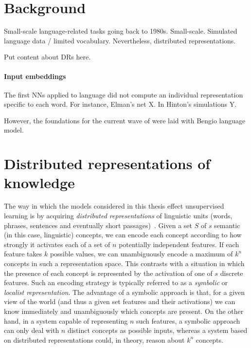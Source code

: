 \documentclass[11pt,letterpaper]{article}
\begin{document}
\section{Background}

Small-scale language-related tasks going back to 1980s. Small-scale. Simulated language data / limited vocabulary. Nevertheless, distributed representations. 

Put content about DRs here. 

\paragraph{Input embeddings}
The first NNs applied to language did not compute an individual representation specific to each word. For instance, Elman's net X. In Hinton's simulations Y. 

However, the foundations for the current wave of were laid with Bengio language model. 


\section{Distributed representations of knowledge} The way in which the models considered in this thesis effect unsupervised learning is by acquiring \emph{distributed representations} of linguistic units (words, phrases, sentences and eventually short passages)~\citep{hinton1986learning}. Given a set \(S\) of \(s\) semantic (in this case, linguistic) concepts, we can encode each concept according to how strongly it activates each of a set of \(n\) potentially independent features. If each feature takes \(k\) possible values, we can unambiguously encode a maximum of \(k^n\) concepts in such a representation space. This contrasts with a situation in which the presence of each concept is represented by the activation of one of \(s\) discrete features. Such an encoding strategy is typically referred to as a \emph{symbolic} or \emph{localist representation}. The advantage of a symbolic approach is that, for a given view of the world (and thus a given set features and their activations) we can know immediately and unambiguously which concepts are present. On the other hand, in a system capable of representing \(n\) such features, a symbolic approach can only deal with \(n\) distinct concepts as possible inputs, whereas a system based on distributed representations could, in theory, reason about \(k^n\) concepts. 
\end{document}
